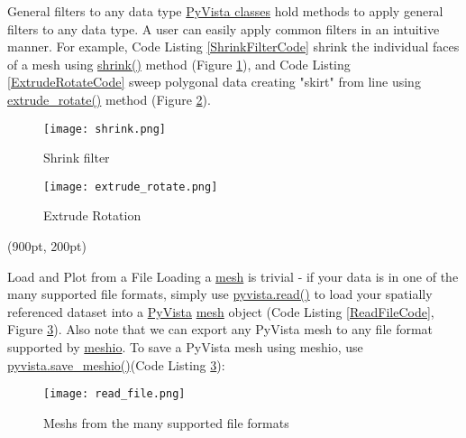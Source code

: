 \documentclass[final]{beamer}
\begin{document}
\begin{frame}[fragile]
\begin{textblock*}{800pt}
\begin{block}{General filters to any data type}
\href{https://docs.pyvista.org/core/filters.html}{PyVista classes} hold methods to apply general filters to any data type.
A user can easily apply common filters in an intuitive manner.
For example,
Code Listing \ref{ShrinkFilterCode} shrink the individual faces of a mesh
using \href{https://docs.pyvista.org/core/filters.html#pyvista.DataSetFilters.shrink}{shrink()} method (Figure \ref{ShrinkFilterFigure}), and
Code Listing \ref{ExtrudeRotateCode} sweep polygonal data creating "skirt" from line
using \href{https://docs.pyvista.org/core/filters.html#pyvista.PolyDataFilters.extrude_rotate}{extrude\_rotate()} method (Figure \ref{ExtrudeRotateFigure}).

\begin{figure}
\texttt{[image: shrink.png]}
\caption{Shrink filter}\label{ShrinkFilterFigure}
\end{figure}

\begin{figure}
\texttt{[image: extrude\_rotate.png]}
\caption{Extrude Rotation}\label{ExtrudeRotateFigure}
\end{figure}
\end{block}
\end{textblock*}

\begin{textblock*}{800pt}(900pt, 200pt)
\begin{block}{Load and Plot from a File}
Loading a \href{https://docs.pyvista.org/getting-started/what-is-a-mesh.html}{mesh} is trivial - if your data is in one of the many supported file formats,
simply use \href{https://docs.pyvista.org/utilities/utilities.html#pyvista.read}{pyvista.read()}
to load your spatially referenced dataset into a \href{https://pypi.org/project/pyvista/}{PyVista} \href{https://docs.pyvista.org/getting-started/what-is-a-mesh.html}{mesh} object
(Code Listing \ref{ReadFileCode}, Figure \ref{ReadFileFigure}).
Also note that we can export any PyVista mesh to any file format supported by \href{https://pypi.org/project/meshio/}{meshio}.
To save a PyVista mesh using meshio, use \href{https://docs.pyvista.org/utilities/utilities.html#pyvista.save_meshio}{pyvista.save\_meshio()}(Code Listing \ref{ReadFileFigure}):

\begin{figure}
\texttt{[image: read\_file.png]}
\caption{Meshs from the many supported file formats}\label{ReadFileFigure}
\end{figure}

\end{block}
\end{textblock*}


\end{frame}
\end{document}
